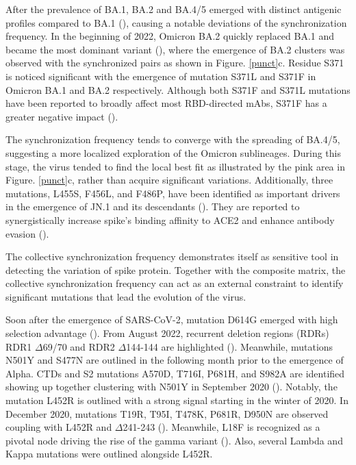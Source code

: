 \documentclass{sysbio}%
\begin{document}
After the prevalence of BA.1, BA.2 and BA.4/5 emerged with distinct antigenic profiles compared to BA.1  (\cite{vitro_BA245,ba45212_escape}), causing a notable deviations of the synchronization frequency. In the beginning of 2022, Omicron BA.2 quickly replaced BA.1 and became the most dominant variant (\cite{ba2}), where the emergence of BA.2 clusters was observed with the synchronized pairs as shown in Figure. \ref{punct}c. Residue S371 is noticed significant with the emergence of mutation S371L and S371F in Omicron BA.1 and BA.2 respectively. Although both S371F and S371L mutations have been reported to broadly affect most RBD-directed mAbs, S371F has a greater negative impact (\cite{371_dejnirattisai2022sars,371_L/Fai2022antibody}).

The synchronization frequency tends to converge with the spreading of BA.4/5, suggesting a more localized exploration of the Omicron sublineages. 
During this stage, the virus tended to find the local best fit as illustrated by the pink area in Figure. \ref{punct}c, rather than acquire significant variations. Additionally, three mutations, L455S, F456L, and F486P, have been identified as important drivers in the emergence of JN.1 and its descendants (\cite{JN1evolution,kpkp3}). They are reported to synergistically increase spike's binding affinity to ACE2 and enhance antibody evasion (\cite{dmsforomi,455,jn1456}).

The collective synchronization frequency demonstrates itself as sensitive tool in detecting the variation of spike protein. Together with the composite matrix, the collective synchronization frequency can act as an external constraint to identify significant mutations that lead the evolution of the virus. 

Soon after the emergence of SARS-CoV-2, mutation D614G emerged with high selection advantage (\cite{614,6141}). From August 2022, recurrent deletion regions (RDRs) RDR1 $\Delta$69/70 and RDR2 $\Delta$144-144 are highlighted (\cite{rdr}). Meanwhile, mutations N501Y and S477N are outlined in the following month prior to the emergence of Alpha. CTDs and S2 mutations A570D, T716I, P681H, and S982A are identified showing up together clustering with N501Y in September 2020 (\cite{alpha_mu}). Notably, the mutation L452R is outlined with a strong signal starting in the winter of 2020. In December 2020, mutations T19R, T95I, T478K, P681R, D950N are observed coupling with L452R and $\Delta$241-243 (\cite{95_saunders2022fusogenicity,478484}). Meanwhile, L18F is recognized as a pivotal node driving the rise of the gamma variant (\cite{215_18,681R,delta_neuta}). Also, several Lambda and Kappa mutations were outlined alongside L452R. 
\end{document}

